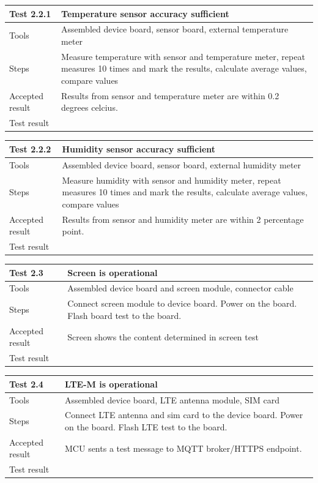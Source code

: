 \documentclass[]{dithesis}
\begin{document}
\bigskip

\begin{tabular}{ | m{3cm} | m{12cm} | }
\hline
\textbf{Test 2.2.1} & \textbf{Temperature sensor accuracy sufficient}  \\
\hline
Tools & Assembled device board, sensor board, external temperature meter \\
\hline
Steps & Measure temperature with sensor and temperature meter, repeat measures 10 times and mark the results, calculate average values, compare values\\
\hline
Accepted result & Results from sensor and temperature meter are within 0.2 degrees celcius. \\
\hline
Test result & \\
\hline
\end{tabular}

\bigskip

\begin{tabular}{ | m{3cm} | m{12cm} | }
\hline
\textbf{Test 2.2.2} & \textbf{Humidity sensor accuracy sufficient}  \\
\hline
Tools & Assembled device board, sensor board, external humidity meter \\
\hline
Steps & Measure humidity with sensor and humidity meter, repeat measures 10 times and mark the results, calculate average values, compare values \\
\hline
Accepted result & Results from sensor and humidity meter are within 2 percentage point. \\
\hline
Test result & \\
\hline
\end{tabular}

\bigskip

\begin{tabular}{| m{3cm} | m{12cm} | }
\hline
\textbf{Test 2.3} & \textbf{Screen is operational}  \\
\hline
Tools & Assembled device board and screen module, connector cable   \\
\hline
Steps & Connect screen module to device board. Power on the board. Flash board test to the board.\\
\hline
Accepted result & Screen shows the content determined in screen test \\
\hline
Test result & \\
\hline
\end{tabular}

\bigskip

\begin{tabular}{| m{3cm} | m{12cm} | }
\hline
\textbf{Test 2.4} & \textbf{LTE-M is operational}  \\
\hline
Tools & Assembled device board, LTE antenna module, SIM card  \\
\hline
Steps & Connect LTE antenna and sim card to the device board. Power on the board. Flash LTE test to the board.\\
\hline
Accepted result & MCU sents a test message to MQTT broker/HTTPS endpoint. \\
\hline
Test result & \\
\hline
\end{tabular}
\end{document}
